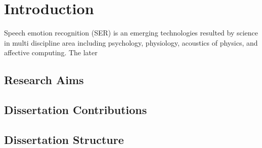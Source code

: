 \newtheorem{theo}{Theorem}
\newtheorem{lemma}{Lemma}
\newtheorem{col}{Corollary}
\newtheorem{defini}{Definition}
\newtheorem{pro}{Property}
\def\bm#1{\mbox{\boldmath{$#1$}}}
\def\eqtri{\stackrel{\triangle}{=}}
\def\c#1{#1^{\dagger}}
\newcommand{\gf}{\mbox{$GF(q)$}}
\newcommand{\av}[1]{\mbox{E${\displaystyle\left[ #1 \right]}$}}
\def\r{\bm{r}}
\def\s{\bm{s}}
\def\w{\bm{w}}
\def\x{\bm{x}}
\def\y{\bm{y}}
\def\a{\bm{a}}
\def\u{\bm{u}}
\def\cX{{\cal X}}
\def\cY{{\cal Y}}
\def\cP{{\cal P}}
\def\cV{{\cal V}}
\newcommand{\g}{\mbox{$\Gamma$}}
\def\qed{\strut\hfill(Q.E.D.)}
\def\eot{\strut\hfill$\Box$}
\def\osum{\bigcirc\hspace{-1.2em}\sum}
\newcommand{\vt}[1]{\mbox{\boldmath $#1$}}

\chapter{Introduction}
Speech emotion recognition (SER) is an emerging technologies resulted 
by science in multi discipline area including psychology, physiology, 
acoustics of physics, and affective computing. The later 


\section{Research Aims}
\section{Dissertation Contributions}
\section{Dissertation Structure}
